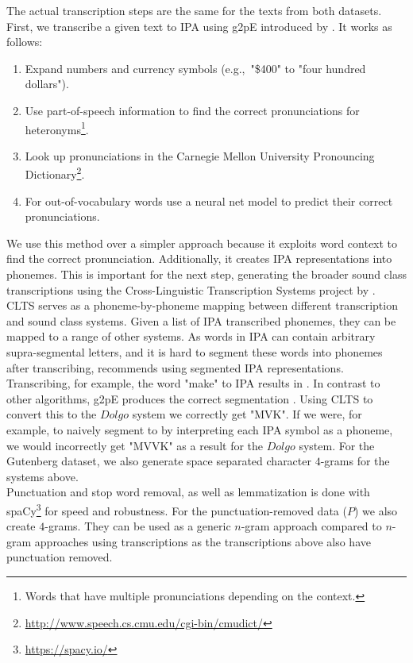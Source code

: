 The actual transcription steps are the same for the texts from both datasets.
First, we transcribe a given text to IPA using g2pE introduced by \cite{kyubyong2019g2pE}.
It works as follows:
\begin{enumerate}
    \item Expand numbers and currency symbols (e.g.,\ "\$400" to "four hundred dollars").
    \item Use part-of-speech information to find the correct pronunciations for heteronyms\footnote{Words that have multiple pronunciations depending on the context.}.
    \item Look up pronunciations in the Carnegie Mellon University Pronouncing Dictionary\footnote{\url{http://www.speech.cs.cmu.edu/cgi-bin/cmudict/}}.
    \item For out-of-vocabulary words use a neural net model to predict their correct pronunciations.
\end{enumerate}
We use this method over a simpler approach because it exploits word context to find the correct pronunciation.
Additionally, it creates IPA representations  into phonemes.
This is important for the next step, generating the broader sound class transcriptions using the Cross-Linguistic Transcription Systems project by \cite{list2018cltsIntro}.
CLTS serves as a phoneme-by-phoneme mapping between different transcription and sound class systems.
Given a list of IPA transcribed phonemes, they can be mapped to a range of other systems.
As words in IPA can contain arbitrary supra-segmental letters, and it is hard to segment these words into phonemes after transcribing, \cite{list2018sequence} recommends using segmented IPA representations.
Transcribing, for example, the word "make" to IPA results in \textipa{[meIk]}.
In contrast to other algorithms, g2pE produces the correct segmentation \textipa{[m eI k]}.
Using CLTS to convert this to the $Dolgo$ system we correctly get "MVK".
If we were, for example, to naively segment \textipa{[meIk]} to \textipa{[m e I k]} by interpreting each IPA symbol as a phoneme, we would incorrectly get "MVVK" as a result for the $Dolgo$ system.
For the Gutenberg dataset, we also generate space separated character $4$-grams for the systems above.\\
Punctuation and stop word removal, as well as lemmatization is done with spaCy\footnote{\url{https://spacy.io/}} for speed and robustness.
For the punctuation-removed data ($P$) we also create $4$-grams.
They can be used as a generic $n$-gram approach compared to $n$-gram approaches using transcriptions as the transcriptions above also have punctuation removed.
